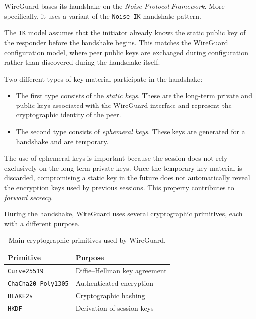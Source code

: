 WireGuard bases its handshake on the \textit{Noise Protocol Framework}. More specifically, it uses a variant of the \texttt{Noise IK} handshake pattern.

The \texttt{IK} model assumes that the initiator already knows the static public key of the responder before the handshake begins. This matches the WireGuard configuration model, where peer public keys are exchanged during configuration rather than discovered during the handshake itself.

\newpage
Two different types of key material participate in the handshake:
\begin{itemize}
	\item The first type consists of the \textit{static keys}. These are the long-term private and public keys associated with the WireGuard interface and represent the cryptographic identity of the peer.
	\item The second type consists of \textit{ephemeral keys}. These keys are generated for a handshake and are temporary.
\end{itemize}

The use of ephemeral keys is important because the session does not rely exclusively on the long-term private keys. Once the temporary key material is discarded, compromising a static key in the future does not automatically reveal the encryption keys used by previous sessions. This property contributes to \textit{forward secrecy}.

During the handshake, WireGuard uses several cryptographic primitives, each with a different purpose.

\begin{table}[htbp]
	\centering
	\caption{Main cryptographic primitives used by WireGuard.}
	\label{tab:wireguard-cryptographic-primitives}

	\begin{tabular}{ll}
		\toprule
		Primitive                  & Purpose                       \\
		\midrule
		\texttt{Curve25519}        & Diffie--Hellman key agreement \\
		\texttt{ChaCha20-Poly1305} & Authenticated encryption      \\
		\texttt{BLAKE2s}           & Cryptographic hashing         \\
		\texttt{HKDF}              & Derivation of session keys    \\
		\bottomrule
	\end{tabular}
\end{table}

